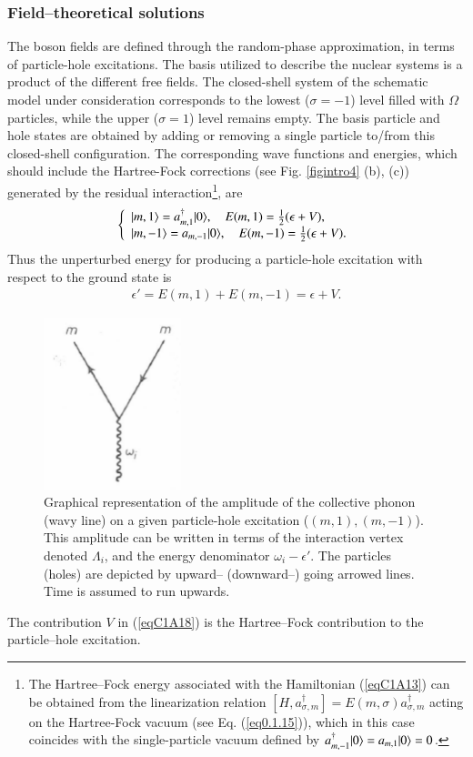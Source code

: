 \subsubsection{Field--theoretical solutions}
 The boson fields are defined through the random-phase
approximation, in terms of particle-hole excitations. The basis utilized to
describe the nuclear systems is a product of the different free fields. 
The closed-shell system of the schematic model under consideration corresponds to the lowest ($\sigma = - 1$) level filled with $\Omega$ particles, while the upper
($\sigma =  1$) level remains empty. The basis particle and hole states are obtained
by adding or removing a single particle to/from this closed-shell configuration.
The corresponding wave functions and energies, which should include the
Hartree-Fock corrections (see Fig. \ref{figintro4} (b), (c)) generated by the residual interaction\footnote{The Hartree--Fock energy associated with the Hamiltonian (\ref{eqC1A13}) can be obtained
from the linearization relation $[H,a_{\sigma,m}^\dagger]=E(m,\sigma)a^\dagger_{\sigma,m}$ acting on the Hartree-Fock
vacuum (see Eq. (\ref{eq0.1.15})), which in this case coincides with the single-particle vacuum defined by
 $a^\dagger_{m,-1}|{0} \rangle=a_{m,1}|{0} \rangle=0$.}, are
 \begin{align}\label{eqC1A17} 
\left\{\begin{array}{l}
 |{m,1} \rangle=a^\dagger_{m,1}|{0} \rangle,\quad E(m,1)=\frac{1}{2}(\epsilon+V),\\ 
|{m,-1} \rangle=a_{m,-1}|{0} \rangle,\quad E(m,-1)=\frac{1}{2}(\epsilon+V).
\end{array} \right.
 \end{align}
Thus the unperturbed energy for producing a particle-hole excitation with
respect to the ground state is
 \begin{align}\label{eqC1A18} 
\epsilon'=E(m,1)+E(m,-1)=\epsilon+V.
 \end{align}
 \begin{figure}
 \centerline {
 \includegraphics*[width=4cm]{introduccion/figs/fig18}
 }
 \caption{Graphical representation of the amplitude of the collective phonon (wavy line) on a given particle-hole excitation ($(m,1),(m,-1)$). This amplitude can be written in terms of the interaction vertex denoted  $\Lambda_i$, and the energy denominator $\omega_i-\epsilon'$. The particles (holes) are depicted by upward-- (downward--) going arrowed lines. Time is assumed to run upwards.}
 \label{figC1A1}
 \end{figure}
The contribution $V$ in (\ref{eqC1A18}) is the Hartree--Fock contribution to the particle--hole excitation.

